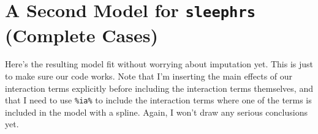 \documentclass[]{book}
\newenvironment{Shaded}{\begin{snugshade}}{\end{snugshade}}
\newcommand{\KeywordTok}[1]{\textcolor[rgb]{0.13,0.29,0.53}{\textbf{#1}}}
\newcommand{\DataTypeTok}[1]{\textcolor[rgb]{0.13,0.29,0.53}{#1}}
\newcommand{\DecValTok}[1]{\textcolor[rgb]{0.00,0.00,0.81}{#1}}
\newcommand{\StringTok}[1]{\textcolor[rgb]{0.31,0.60,0.02}{#1}}
\newcommand{\OperatorTok}[1]{\textcolor[rgb]{0.81,0.36,0.00}{\textbf{#1}}}
\newcommand{\NormalTok}[1]{#1}
\theoremstyle{definition}
\theoremstyle{definition}
\theoremstyle{definition}
\theoremstyle{remark}
\begin{document}
\section{\texorpdfstring{A Second Model for \texttt{sleephrs} (Complete
Cases)}{A Second Model for sleephrs (Complete Cases)}}\label{a-second-model-for-sleephrs-complete-cases}

Here's the resulting model fit without worrying about imputation yet.
This is just to make sure our code works. Note that I'm inserting the
main effects of our interaction terms explicitly before including the
interaction terms themselves, and that I need to use \texttt{\%ia\%} to
include the interaction terms where one of the terms is included in the
model with a spline. Again, I won't draw any serious conclusions yet.

\begin{Shaded}
\end{Shaded}
\end{document}

